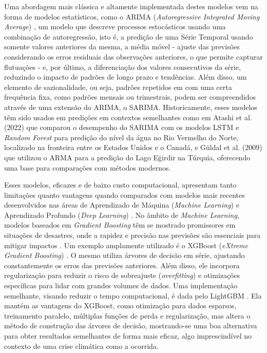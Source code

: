 Uma abordagem mais clássica e altamente implementada destes modelos vem na forma de modelos estatísticos, como o ARIMA
(\textit{Autoregressive Integrated Moving Average}) \cite{box}, um modelo que descreve processos estocásticos usando uma
combinação de autoregressão, isto é, a predição de uma Série Temporal usando somente valores anteriores da mesma, a
média móvel - ajuste das previsões considerando os erros residuais das observações anteriores, o que permite capturar
flutuações - e, por último, a diferenciação dos valores consecutivos da série, reduzindo o impacto de padrões de longo
prazo e tendências. Além disso, um elemento de sazionalidade, ou seja, padrões repetidos em com uma certa frequência
fixa, como padrões mensais ou trimestrais, podem ser compreendidos através de uma extensão do ARIMA, o SARIMA.
Historicamente, esses modelos têm sido usados em predições em contextos semelhantes como em Atashi et al. (2022)
\cite{atashi} que comparou o desempenho do SARIMA com os modelos LSTM e \textit{Random Forest} para predição do nível da
água no Rio Vermelho do Norte, localizado na fronteira entre os Estados Unidos e o Canadá, e Güldal et al. (2009)
\cite{gudal} que utilizou o ARMA para a predição do Lago Eğirdir na Túrquia, oferecendo uma base para comparações com
métodos modernos.


Esses modelos, eficazes e de baixo custo computacional, apresentam tanto limitações quanto vantagens quando comparados
com modelos mais recentes desenvolvidos nas áreas de Aprendizado de Máquina (\textit{Machine Learning}) e Aprendizado
Profundo (\textit{Deep Learning}) \cite{kontopoulou}. No âmbito de \textit{Machine Learning}, modelos baseados em
\textit{Gradient Boosting} têm se mostrado promissores em situações de desastres, onde a rapidez e precisão nas
previsões são essenciais para mitigar impactos \cite{albahri}. Um exemplo amplamente utilizado é o XGBoost
(\textit{eXtreme Gradient Boosting}) \cite{chen_xgboost}. O mesmo utiliza árvores de decisão em série, ajustando
constantemente os erros das previsões anteriores. Além disso, ele incorpora regularização para reduzir o risco de
sobreajuste (\textit{overfitting}) e otimizações específicas para lidar com grandes volumes de dados. Uma implementação
semelhante, visando reduzir o tempo computacional, é dada pelo LightGBM \cite{lightgbm}. Ela mantém as vantagens do
XGBoost, como otimização para dados esparsos, treinamento paralelo, múltiplas funções de perda e regularização, mas
altera o método de construção das árvores de decisão, mostrando-se uma boa alternativa para obter resultados semelhantes
de forma mais eficaz, algo imprescindível no contexto de uma crise climática como a ocorrida.

